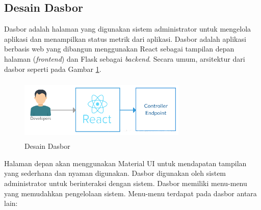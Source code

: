 		\subsection{Desain Dasbor}
        	Dasbor adalah halaman yang digunakan sistem administrator untuk mengelola aplikasi dan menampilkan status metrik dari aplikasi. Dasbor adalah aplikasi berbasis web yang dibangun menggunakan React sebagai tampilan depan halaman (\textit{frontend}) dan Flask sebagai \textit{backend}. Secara umum, arsitektur dari dasbor seperti pada Gambar \ref{desain:dasbor}. \\
            \begin{figure}[H]
				\centering
				\includegraphics[width=8cm,height=3cm]{Images/C-3/dashboard.png}
				\caption{Desain Dasbor}
				\label{desain:dasbor}
			\end{figure}
            \indent Halaman depan akan menggunakan Material UI untuk mendapatan tampilan yang sederhana dan nyaman digunakan. Dasbor digunakan oleh sistem administrator untuk berinteraksi dengan sistem. Dasbor memiliki menu-menu yang memudahkan pengelolaan sistem. Menu-menu terdapat pada dasbor antara lain:
